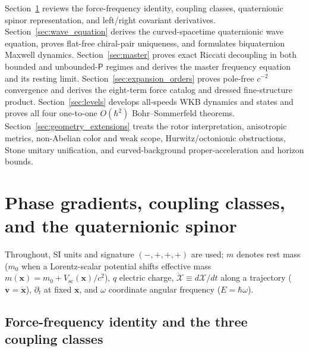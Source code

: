 \documentclass[aps,prd,onecolumn,tightenlines,nofootinbib,notitlepage,10pt,floatfix]{revtex4-2}
\theoremstyle{indentedtheorem}
\begin{document}
Section~\ref{sec:foundations} reviews the force-frequency identity, coupling classes, quaternionic spinor representation, and left/right covariant derivatives. Section~\ref{sec:wave_equation} derives the curved-spacetime quaternionic wave equation, proves flat-free chiral-pair uniqueness, and formulates biquaternion Maxwell dynamics. Section~\ref{sec:master} proves exact Riccati decoupling in both bounded and unbounded-$\mathsf{P}$ regimes and derives the master frequency equation and its resting limit. Section~\ref{sec:expansion_orders} proves pole-free $c^{-2}$ convergence and derives the eight-term force catalog and dressed fine-structure product. Section~\ref{sec:levels} develops all-speeds WKB dynamics and states and proves all four one-to-one $O(\hbar^2)$ Bohr--Sommerfeld theorems. Section~\ref{sec:geometry_extensions} treats the rotor interpretation, anisotropic metrics, non-Abelian color and weak scope, Hurwitz/octonionic obstructions, Stone unitary unification, and curved-background proper-acceleration and horizon bounds.

\section{Phase gradients, coupling classes, and the quaternionic spinor}
\label{sec:foundations}

Throughout, SI units and signature $(-,+,+,+)$ are used; $m$ denotes rest mass ($m_0$ when a Lorentz-scalar potential shifts effective mass $m(\mathbf{x})=m_0+V_\text{sc}(\mathbf{x})/c^2$), $q$ electric charge, $\dot{\mathcal{X}}\equiv d\mathcal{X}/dt$ along a trajectory ($\mathbf{v}=\dot{\mathbf{x}}$), $\partial_t$ at fixed $\mathbf{x}$, and $\omega$ coordinate angular frequency ($E=\hbar\omega$).

\subsection{Force-frequency identity and the three coupling classes}
\label{sec:sgm_summary}
\end{document}
